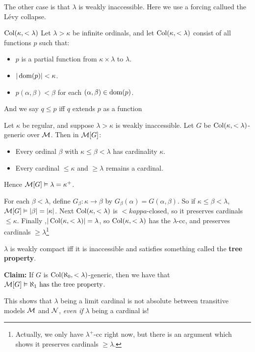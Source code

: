 \documentclass{article}
\begin{document}
    The other case is that $\lambda$ is weakly inaccessible. Here we use a forcing callued the L\'evy collapse.
    \begin{fancydefine}{$\operatorname{Col}(\kappa, < \lambda)$}
        Let $\lambda > \kappa$ be infinite ordinals, and let $\operatorname{Col}(\kappa, <\lambda)$ consist of all functions $p$ such that: \begin{itemize}
            \item $p$ is a partial function from $\kappa \times \lambda$ to $\lambda$.
            \item $|\operatorname{dom}(p)| < \kappa$.
            \item $p(\alpha, \beta) < \beta$ for each $(\alpha, \beta) \in \operatorname{dom}(p)$.
        \end{itemize}
        And we say $q \leq p$ iff $q$ extends $p$ as a function
    \end{fancydefine}
    \begin{fancythm}{}
        Let $\kappa$ be regular, and suppose $\lambda > \kappa$ is weakly inaccessible. Let $G$ be $\operatorname{Col}(\kappa, <\lambda)$-generic over $\mathcal{M}$. Then in $\mathcal{M}[G]$: \begin{itemize}
            \item Every ordinal $\beta$ with $\kappa \leq \beta < \lambda$ has cardinality $\kappa$.
            \item Every cardinal $\leq \kappa$ and $\geq \lambda$ remains a cardinal.
        \end{itemize}
        Hence $\mathcal{M}[G] \vDash \lambda = \kappa^{+}$.
    \end{fancythm}
    \proof For each $\beta < \lambda$, define $G_{\beta} : \kappa \to \beta$ by $G_{\beta}(\alpha) = G(\alpha,\beta)$. So if $\kappa \leq \beta < \lambda$, $\mathcal{M}[G] \vDash |\beta| = |\kappa|$. Next $\operatorname{Col}(\kappa, <\lambda)$ is $<kappa$-closed, so it preserves cardinals $\leq \kappa$. Finally ,$|\operatorname{Col}(\kappa, <\lambda)| = \lambda$, so $\operatorname{Col}(\kappa, < \lambda)$ has the $\lambda$-cc, and preserves cardinals $\geq \lambda$\footnote{Actually, we only have $\lambda^{+}$-cc right now, but there is an argument which shows it preserves cardinals $\geq \lambda$.} \endproof
    \begin{remark*}
        $\lambda$ is weakly compact iff it is inaccessible and satisfies something called the \textbf{tree property}.
    \end{remark*}
    \textbf{Claim:} If $G$ is $\operatorname{Col}(\aleph_{0}, <\lambda)$-generic, then we have that $\mathcal{M}[G] \vDash \aleph_{1}\text{ has the tree property}$.
    \begin{remark*}
        This shows that $\lambda$ being a limit cardinal is not absolute between transitive models $\mathcal{M}$ and $\mathcal{N}$, \textit{even if} $\lambda$ being a cardinal is!
    \end{remark*}
\end{document}
